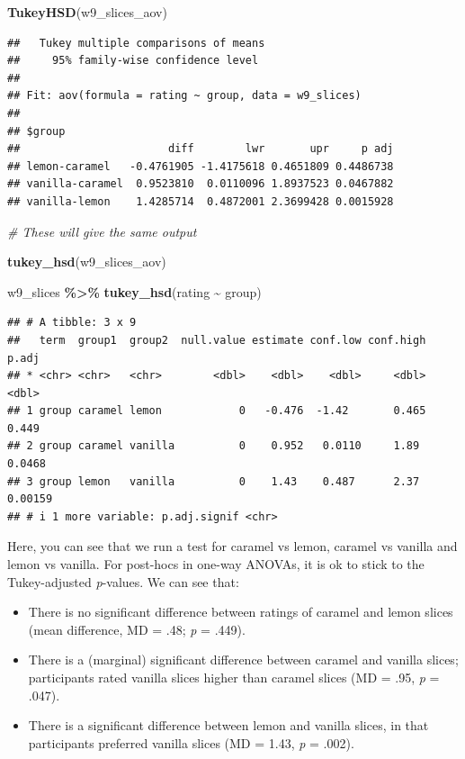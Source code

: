 \documentclass[
]{book}
\newenvironment{Shaded}{\begin{snugshade}}{\end{snugshade}}
\newcommand{\CommentTok}[1]{\textcolor[rgb]{0.56,0.35,0.01}{\textit{#1}}}
\newcommand{\FunctionTok}[1]{\textcolor[rgb]{0.13,0.29,0.53}{\textbf{#1}}}
\newcommand{\NormalTok}[1]{#1}
\newcommand{\SpecialCharTok}[1]{\textcolor[rgb]{0.81,0.36,0.00}{\textbf{#1}}}
\providecommand{\tightlist}{%
  \setlength{\itemsep}{0pt}\setlength{\parskip}{0pt}}
\begin{document}
\begin{Shaded}
\begin{Highlighting}[]
\FunctionTok{TukeyHSD}\NormalTok{(w9\_slices\_aov)}
\end{Highlighting}
\end{Shaded}

\begin{verbatim}
##   Tukey multiple comparisons of means
##     95% family-wise confidence level
## 
## Fit: aov(formula = rating ~ group, data = w9_slices)
## 
## $group
##                       diff        lwr       upr     p adj
## lemon-caramel   -0.4761905 -1.4175618 0.4651809 0.4486738
## vanilla-caramel  0.9523810  0.0110096 1.8937523 0.0467882
## vanilla-lemon    1.4285714  0.4872001 2.3699428 0.0015928
\end{verbatim}

\begin{Shaded}
\begin{Highlighting}[]
\CommentTok{\# These will give the same output}

\FunctionTok{tukey\_hsd}\NormalTok{(w9\_slices\_aov)}

\NormalTok{w9\_slices }\SpecialCharTok{\%\textgreater{}\%}
  \FunctionTok{tukey\_hsd}\NormalTok{(rating }\SpecialCharTok{\textasciitilde{}}\NormalTok{ group)}
\end{Highlighting}
\end{Shaded}

\begin{verbatim}
## # A tibble: 3 x 9
##   term  group1  group2  null.value estimate conf.low conf.high   p.adj
## * <chr> <chr>   <chr>        <dbl>    <dbl>    <dbl>     <dbl>   <dbl>
## 1 group caramel lemon            0   -0.476  -1.42       0.465 0.449  
## 2 group caramel vanilla          0    0.952   0.0110     1.89  0.0468 
## 3 group lemon   vanilla          0    1.43    0.487      2.37  0.00159
## # i 1 more variable: p.adj.signif <chr>
\end{verbatim}

Here, you can see that we run a test for caramel vs lemon, caramel vs vanilla and lemon vs vanilla. For post-hocs in one-way ANOVAs, it is ok to stick to the Tukey-adjusted \emph{p}-values. We can see that:

\begin{itemize}
\tightlist
\item
  There is no significant difference between ratings of caramel and lemon slices (mean difference, MD = .48; \emph{p} = .449).
\item
  There is a (marginal) significant difference between caramel and vanilla slices; participants rated vanilla slices higher than caramel slices (MD = .95, \emph{p} = .047).
\item
  There is a significant difference between lemon and vanilla slices, in that participants preferred vanilla slices (MD = 1.43, \emph{p} = .002).
\end{itemize}
\end{document}

